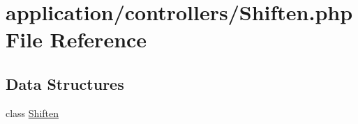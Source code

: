 \hypertarget{_shiften_8php}{}\section{application/controllers/\+Shiften.php File Reference}
\label{_shiften_8php}
\subsection*{Data Structures}
\begin{DoxyCompactItemize}
\item 
class \mbox{\hyperlink{class_shiften}{Shiften}}
\end{DoxyCompactItemize}
